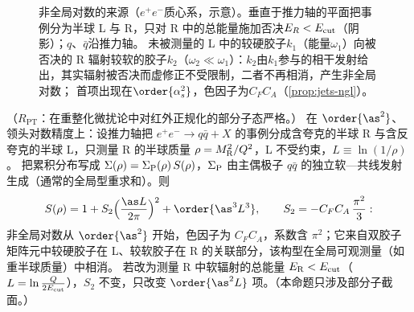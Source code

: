 \begin{figure}[htbp]
\caption{非全局对数的来源（$e^+e^-$质心系，示意）。垂直于推力轴的平面把事例分为半球 L 与 R，只对 R 中的总能量施加否决$E_R<E_{\rm cut}$（阴影）；$q$、$\bar q$沿推力轴。
未被测量的 L 中的较硬胶子$k_1$（能量$\omega_1$）向被否决的 R 辐射较软的胶子$k_2$（$\omega_2\ll\omega_1$）：$k_2$由$k_1$参与的相干发射给出，其实辐射被否决而虚修正不受限制，二者不再相消，产生非全局对数；
首项出现在$\order{\alpha_s^2}$，色因子为$C_FC_A$（\cref{prop:jets-ngl}）。}
\label{fig:jets-ngl}
\end{figure}

\begin{proposition}\label{prop:jets-ngl}
（$R_{\mathrm{PT}}$：在重整化微扰论中对红外正规化的部分子态严格。）
在 $\order{\as^2}$、领头对数精度上：设推力轴把 $e^+e^-\to q\bar q+X$ 的事例分成含夸克的半球 R 与含反夸克的半球 L，只测量 R 的半球质量 $\rho=M_{\rm R}^2/Q^2$，L 不受约束，$L\equiv\ln(1/\rho)$。
把累积分布写成 $\Sigma(\rho)=\Sigma_{\rm P}(\rho)\,S(\rho)$，$\Sigma_{\rm P}$ 由主偶极子 $q\bar q$ 的独立软—共线发射生成（通常的全局型重求和）。则
\begin{equation}\label{eq:jets-S2}
S(\rho)=1+S_2\Big(\frac{\as L}{2\pi}\Big)^2+\order{\as^3L^3},\qquad S_2=-C_FC_A\,\frac{\pi^2}{3}:
\end{equation}
非全局对数从 $\order{\as^2}$ 开始，色因子为 $C_FC_A$，系数含 $\pi^2$；它来自双胶子矩阵元中较硬胶子在 L、较软胶子在 R 的关联部分，该构型在全局可观测量（如重半球质量）中相消。
若改为测量 R 中软辐射的总能量 $E_{\rm R}<E_{\rm cut}$（$L=\ln\frac{Q}{2E_{\rm cut}}$），$S_2$ 不变，只改变 $\order{\as^2L}$ 项。（本命题只涉及部分子截面。）
\end{proposition}

